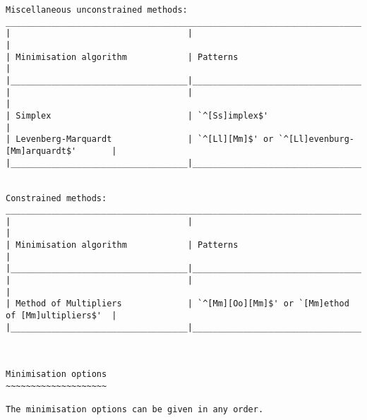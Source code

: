 {\begin{verbatim}
Miscellaneous unconstrained methods:
___________________________________________________________________________________________
|                                   |                                                     |
| Minimisation algorithm            | Patterns                                            |
|___________________________________|_____________________________________________________|
|                                   |                                                     |
| Simplex                           | `^[Ss]implex$'                                      |
| Levenberg-Marquardt               | `^[Ll][Mm]$' or `^[Ll]evenburg-[Mm]arquardt$'       |
|___________________________________|_____________________________________________________|


Constrained methods:
___________________________________________________________________________________________
|                                   |                                                     |
| Minimisation algorithm            | Patterns                                            |
|___________________________________|_____________________________________________________|
|                                   |                                                     |
| Method of Multipliers             | `^[Mm][Oo][Mm]$' or `[Mm]ethod of [Mm]ultipliers$'  |
|___________________________________|_____________________________________________________|



Minimisation options
~~~~~~~~~~~~~~~~~~~~

The minimisation options can be given in any order.



\end{verbatim}}

